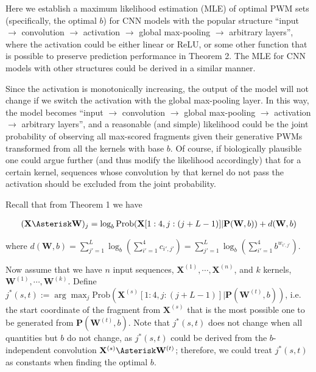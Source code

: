 \documentclass[12pt]{article}
\newcommand{\matrixSymbol}[1]{\mathbf{#1}}
\begin{document}
Here we establish a maximum likelihood estimation (MLE) of optimal PWM sets (specifically, the optimal $b$) for CNN models with the popular structure ``input $\rightarrow$ convolution $\rightarrow$ activation $\rightarrow$ global max-pooling $\rightarrow$ arbitrary layers'', where the activation could be either linear or ReLU, or some other function that is possible to preserve prediction performance in Theorem 2. The MLE for CNN models with other structures could be derived in a similar manner.

Since the activation is monotonically increasing, the output of the model will not change if we switch the activation with the global max-pooling layer. In this way, the model becomes ``input $\rightarrow$ convolution $\rightarrow$ global max-pooling $\rightarrow$ activation  $\rightarrow$ arbitrary layers'', and a reasonable (and simple) likelihood could be the joint probability of observing all max-scored fragments given their generative PWMs transformed from all the kernels with base $b$. Of course, if biologically plausible one could argue further (and thus modify the likelihood accordingly) that for a certain kernel, sequences whose convolution by that kernel do not pass the activation should be excluded from the joint probability.


Recall that from Theorem 1 we have

\begin{align}
 (\matrixSymbol{X} \Asterisk \matrixSymbol{W})_j = \log_b{\mathrm{Prob}(\matrixSymbol{X}[1:4, j:(j+L-1)]|\matrixSymbol{P}(\matrixSymbol{W}, b))} + d(\matrixSymbol{W}, b)
\end{align}

where $d(\matrixSymbol{W}, b) = \sum_{j'=1}^{L}{\log_{b} \left( \sum_{i'=1}^{4}{c_{i', j'}} \right)} = \sum_{j'=1}^{L}{\log_{b} \left( \sum_{i'=1}^{4}{b^{w_{i', j'}}} \right)}$.

Now assume that we have $n$ input sequences, $\matrixSymbol{X}^{(1)}, \cdots, \matrixSymbol{X}^{(n)}$, and $k$ kernels, $\matrixSymbol{W}^{(1)}, \cdots, \matrixSymbol{W}^{(k)}$. Define $j^*(s, t) := \arg\max_{j}\mathrm{Prob}(\matrixSymbol{X}^{(s)}[1:4, j:(j+L-1)]|\matrixSymbol{P}(\matrixSymbol{W}^{(t)}, b))$, i.e. the start coordinate of the fragment from $\matrixSymbol{X}^{(s)}$ that is the most possible one to be generated from $\matrixSymbol{P}(\matrixSymbol{W}^{(t)}, b)$. Note that $j^*(s, t)$ does not change when all quantities but $b$ do not change, as $j^*(s, t)$ could be derived from the $b$-independent convolution $\matrixSymbol{X}^{(s)} \Asterisk \matrixSymbol{W}^{(t)}$; therefore, we could treat $j^*(s, t)$ as constants when finding the optimal $b$.
\end{document}
